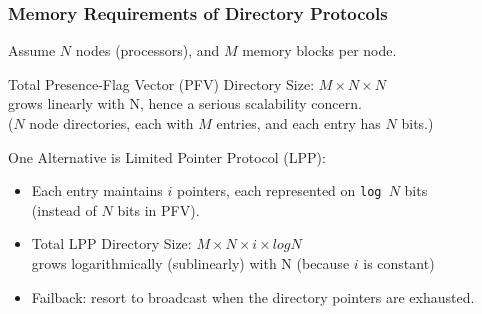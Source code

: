 \documentclass{beamer}
\renewcommand{\emph}[1]{\textcolor{structure}{#1}}
\newcommand{\emp}[1]{\textcolor{DikuRed}{ #1}}
\begin{document}
\begin{frame}[fragile,t]
\frametitle{Memory Requirements of Directory Protocols}

Assume $N$ nodes (processors), and $M$ memory blocks per node.
\bigskip


\emp{Total Presence-Flag Vector (PFV) Directory Size:} $M\times N\times$\alert{$N$}\\
\alert{grows linearly with N, hence a serious scalability concern.}\\
($N$ node directories, each with $M$ entries, and each entry has $N$ bits.)
\bigskip

One Alternative is Limited Pointer Protocol (LPP):
\begin{itemize}
    \item Each entry maintains $i$ pointers, each represented on {\tt log $N$} bits\\
            (instead of $N$ bits in PFV).
    \item \emp{Total LPP Directory Size:} $M\times N\times i \times$\emph{$log N$}\\ 
            \emph{grows logarithmically (sublinearly) with N} (because $i$ is constant) 
    \item Failback: resort to broadcast when the directory pointers are exhausted.
\end  {itemize}

\end{frame}
\end{document}
